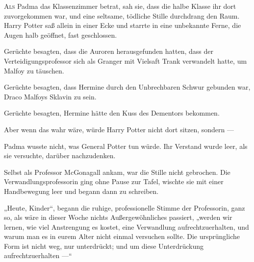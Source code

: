 
\lettrine{A}{ls} Padma das Klassenzimmer betrat, sah sie, dass die halbe Klasse ihr dort zuvorgekommen war, und eine seltsame, tödliche Stille durchdrang den Raum. Harry Potter saß allein in einer Ecke und starrte in eine unbekannte Ferne, die Augen halb geöffnet, fast geschlossen.

Gerüchte besagten, dass die Auroren herausgefunden hatten, dass der Verteidigungsprofessor sich als Granger mit Vielsaft Trank verwandelt hatte, um Malfoy zu täuschen.

Gerüchte besagten, dass Hermine durch den Unbrechbaren Schwur gebunden war, Draco Malfoys Sklavin zu sein.

Gerüchte besagten, Hermine hätte den Kuss des Dementors bekommen.

Aber wenn das wahr wäre, würde Harry Potter nicht dort sitzen, sondern —

Padma wusste nicht, was General Potter tun würde. Ihr Verstand wurde leer, als sie versuchte, darüber nachzudenken.

Selbst als Professor McGonagall ankam, war die Stille nicht gebrochen. Die Verwandlungsprofessorin ging ohne Pause zur Tafel, wischte sie mit einer Handbewegung leer und begann dann zu schreiben.

„Heute, Kinder“, begann die ruhige, professionelle Stimme der Professorin, ganz so, als wäre in dieser Woche nichts Außergewöhnliches passiert, „werden wir lernen, wie viel Anstrengung es kostet, eine Verwandlung aufrechtzuerhalten, und warum man es in eurem Alter nicht einmal versuchen sollte. Die ursprüngliche Form ist nicht weg, nur unterdrückt; und um diese Unterdrückung aufrechtzuerhalten —“

